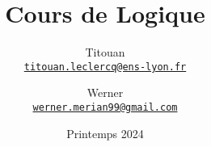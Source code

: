 \title{Cours de Logique}
\author{%
	Titouan \\%
	\href{mailto:titouan.leclercq@ens-lyon.fr}{\texttt{titouan.leclercq@ens-lyon.fr}}%
	\and%
	Werner \\%
	\href{mailto:werner.merian99@gmail.com}{\texttt{werner.merian99@gmail.com}}%
}
\date{Printemps 2024}